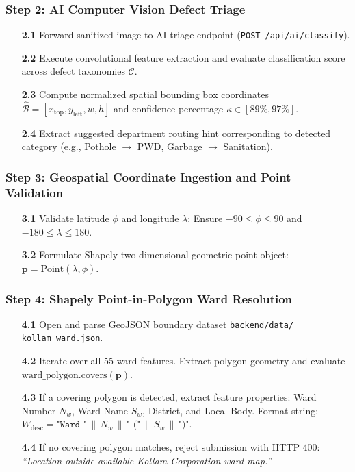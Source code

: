 \documentclass[12pt,a4paper]{report}
\begin{document}
\subsubsection*{Step 2: AI Computer Vision Defect Triage}
\begin{enumerate}
  \item[\textbf{2.1}] Forward sanitized image to AI triage endpoint (\texttt{POST /api/ai/classify}).
  \item[\textbf{2.2}] Execute convolutional feature extraction and evaluate classification score across defect taxonomies $\mathcal{C}$.
  \item[\textbf{2.3}] Compute normalized spatial bounding box coordinates $\hat{\mathcal{B}} = [x_{\text{top}}, y_{\text{left}}, w, h]$ and confidence percentage $\kappa \in [89\%, 97\%]$.
  \item[\textbf{2.4}] Extract suggested department routing hint corresponding to detected category (e.g., Pothole $\to$ PWD, Garbage $\to$ Sanitation).
\end{enumerate}

\subsubsection*{Step 3: Geospatial Coordinate Ingestion and Point Validation}
\begin{enumerate}
  \item[\textbf{3.1}] Validate latitude $\phi$ and longitude $\lambda$: Ensure $-90 \le \phi \le 90$ and $-180 \le \lambda \le 180$.
  \item[\textbf{3.2}] Formulate Shapely two-dimensional geometric point object: $\mathbf{p} = \mathrm{Point}(\lambda, \phi)$.
\end{enumerate}

\subsubsection*{Step 4: Shapely Point-in-Polygon Ward Resolution}
\begin{enumerate}
  \item[\textbf{4.1}] Open and parse GeoJSON boundary dataset \texttt{backend/data/} \allowbreak \texttt{kollam\_ward.json}.
  \item[\textbf{4.2}] Iterate over all 55 ward features. Extract polygon geometry and evaluate $\mathrm{ward\_polygon.covers}(\mathbf{p})$.
  \item[\textbf{4.3}] If a covering polygon is detected, extract feature properties: Ward Number $N_w$, Ward Name $S_w$, District, and Local Body. Format string: $W_{\text{desc}} = \texttt{"Ward "} \,\|\, N_w \,\|\, \texttt{" ("} \,\|\, S_w \,\|\, \texttt{")"}$.
  \item[\textbf{4.4}] If no covering polygon matches, reject submission with HTTP 400: \textit{``Location outside available Kollam Corporation ward map.''}
\end{enumerate}
\end{document}
